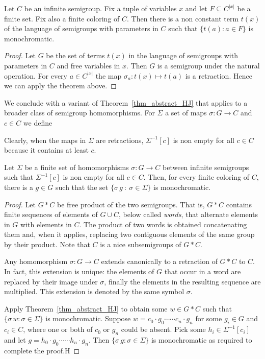 \documentclass[creche.tex]{subfiles}
\begin{document}
\begin{HalesJewett}\label{thm_HalesJewett}
Let $C$ be an infinite semigroup.
Fix a tuple of variables $x$ and let $F\subseteq C^{|x|}$ be a finite set.
Fix also a finite coloring of $C$.
Then there is a non constant term $t(x)$ 
of the language of semigroups with parameters in $C$
such that $\{ t(a): a\in F\}$ is monochromatic.
\end{HalesJewett}

\begin{proof}
Let $G$ be the set of terms $t(x)$ in the language of semigroups 
with parameters in $C$ and free variables in $x$.
Then $G$ is a semigroup under the natural operation.
For every $a\in C^{|x|}$ the map $\sigma_a:t(x)\mapsto t(a)$ is a retraction.
Hence we can apply the theorem above.
\end{proof}

We conclude with a variant of Theorem~\ref{thm_abstract_HJ} that applies to 
a broader class of semigroup homomorphisms. 
%
For $\Sigma$ a set of maps $\sigma:G\to C$ and $c\in C$ we define 

\smallskip

Clearly, when the maps in $\Sigma$ are retractions, $\Sigma^{-1}[c]$ is non empty for all $c\in C$ because it contains at least $c$.

\begin{HalesJewett}\label{thm_hom_HJ}
Let $\Sigma$ be a finite set of homomorphisms $\sigma:G\to C$ 
between infinite semigroups
such that $\Sigma^{-1}[c]$ is non empty for all $c\in C$.
Then, for every finite coloring of $C$, there is a $g\in G$ such that the set 
$\{\sigma\,g\ :\ \sigma\in\Sigma\}$ is monochromatic.
\end{HalesJewett}

\begin{proof}
Let $G*C$ be free product of the two semigroups.
That is, $G*C$ contains finite sequences of elements of $G\cup C$, below called \textit{words}, that alternate elements in $G$ with elements in $C$.
The product of two words is obtained concatenating them and, when it applies, replacing two contiguous elements of the same group by their product.
Note that $C$ is a nice subsemigroups of $G*C$.

Any homomorphism $\sigma:G\to C$ extends canonically to a retraction of $G*C$ to $C$.
In fact, this extension is unique: the elements of $G$ that occur in a word are replaced by their image under $\sigma$, finally the elements in the resulting sequence are multiplied.
This extension is denoted by the same symbol $\sigma$.

Apply Theorem~\ref{thm_abstract_HJ} to obtain some $w\in G*C$ such that 
$\{\sigma \,w:\sigma\in\Sigma\}$ is monochromatic.
%
Suppose $w=c_0\cdot g_0\cdots\cdots c_n\cdot g_n$ for some $g_i\in G$ and $c_i\in C$, 
where one or both of $c_0$ or $g_n$ could be absent. Pick some $h_i\in\Sigma^{-1}[c_i]$ and 
let $g=h_0\cdot g_0\cdots\cdots h_n\cdot g_n$.
%
Then $\{\sigma\,g:\sigma\in\Sigma\}$ is monochromatic as required to complete the proof.H
\end{proof}
\end{document}
